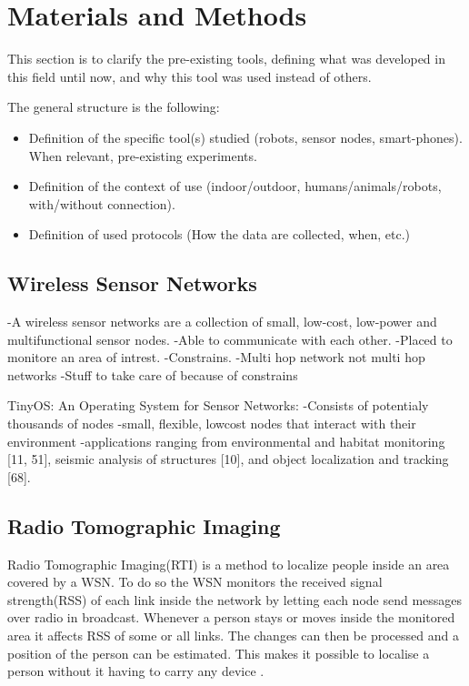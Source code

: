 \chapter{Materials and Methods}

This section is to clarify the pre-existing tools, defining what was developed in this field until now, and why this tool was used instead of others.

The general structure is the following:
\begin{itemize}
	\item Definition of the specific tool(s) studied (robots, sensor nodes, smart-phones). When relevant, pre-existing experiments.
	\item Definition of the context of use (indoor/outdoor, humans/animals/robots, with/without connection).
	\item Definition of used protocols (How the data are collected, when, etc.)
\end{itemize}

\section{Wireless Sensor Networks}
-A wireless sensor networks are a collection of small, low-cost, low-power and multifunctional sensor nodes.
-Able to communicate with each other. 
-Placed to monitore an area of intrest.
-Constrains.	
-Multi hop network not multi hop networks
-Stuff to take care of because of constrains

TinyOS: An Operating System for Sensor Networks:
-Consists of potentialy thousands of nodes
-small, flexible, lowcost nodes that interact with their environment
-applications ranging from environmental and habitat monitoring [11, 51], seismic analysis of structures [10], and object localization and tracking [68].


\section{Radio Tomographic Imaging}
Radio Tomographic Imaging(RTI) is a method to localize people inside an area covered by a WSN. To do so the WSN monitors the received signal strength(RSS) of each link inside the network by letting each node send messages over radio in broadcast. Whenever a person stays or moves inside the monitored area it affects RSS of some or all links. The changes can then be processed and a position of the person can be estimated. This makes it possible to localise a person without it having to carry any device \cite{RtiMulti}.

